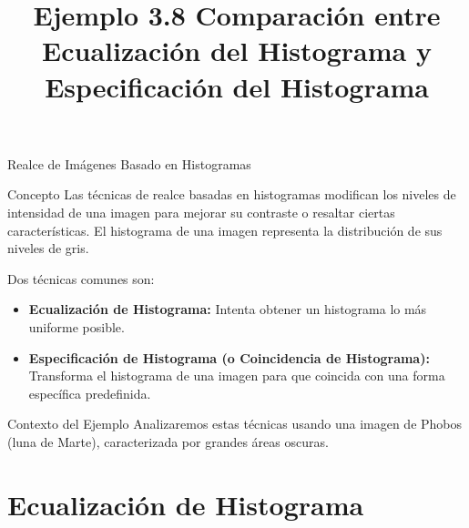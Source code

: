 \documentclass{beamer}
\begin{document}
\title[Ejemplo]{Ejemplo 3.8 Comparación entre Ecualización del Histograma y Especificación del Histograma}
\subtitle{}
\author[Tu Nombre/Institución]{}
\date{}
\institute{}
\begin{frame}
  \titlepage
\end{frame}

\begin{frame}{Realce de Imágenes Basado en Histogramas}
    \begin{block}{Concepto}
        Las técnicas de realce basadas en histogramas modifican los niveles de intensidad de una imagen para mejorar su contraste o resaltar ciertas características. El histograma de una imagen representa la distribución de sus niveles de gris.
    \end{block}
    Dos técnicas comunes son:
    \begin{itemize}
        \item \textbf{Ecualización de Histograma:} Intenta obtener un histograma lo más uniforme posible.
        \item \textbf{Especificación de Histograma (o Coincidencia de Histograma):} Transforma el histograma de una imagen para que coincida con una forma específica predefinida.
    \end{itemize}
    \vfill
    \begin{alertblock}{Contexto del Ejemplo}
        Analizaremos estas técnicas usando una imagen de Phobos (luna de Marte), caracterizada por grandes áreas oscuras.
    \end{alertblock}
\end{frame}

\section{Ecualización de Histograma}
\end{document}
